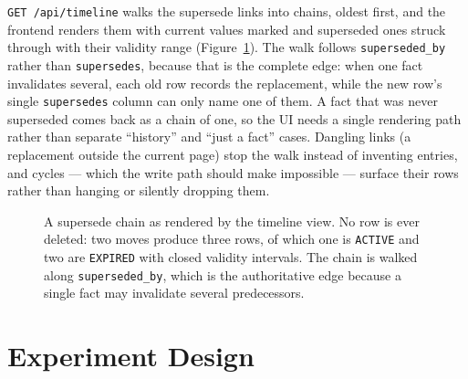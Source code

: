 \documentclass[11pt,a4paper]{article}
\begin{document}
\texttt{GET /api/timeline} walks the supersede links into chains, oldest first,
and the frontend renders them with current values marked and superseded ones
struck through with their validity range (Figure~\ref{fig:chain}). The walk
follows \texttt{superseded\_by} rather than \texttt{supersedes}, because that is
the complete edge: when one fact invalidates several, each old row records the
replacement, while the new row's single \texttt{supersedes} column can only name
one of them. A fact that was never superseded comes back as a chain of one, so
the UI needs a single rendering path rather than separate ``history'' and ``just
a fact'' cases. Dangling links (a replacement outside the current page) stop the
walk instead of inventing entries, and cycles --- which the write path should
make impossible --- surface their rows rather than hanging or silently dropping
them.

\begin{figure}[htbp]
\centering
{}
\caption{A supersede chain as rendered by the timeline view. No row is ever
deleted: two moves produce three rows, of which one is \texttt{ACTIVE} and two
are \texttt{EXPIRED} with closed validity intervals. The chain is walked along
\texttt{superseded\_by}, which is the authoritative edge because a single fact
may invalidate several predecessors.}
\label{fig:chain}
\end{figure}

\section{Experiment Design}
\label{sec:exp}
\end{document}
